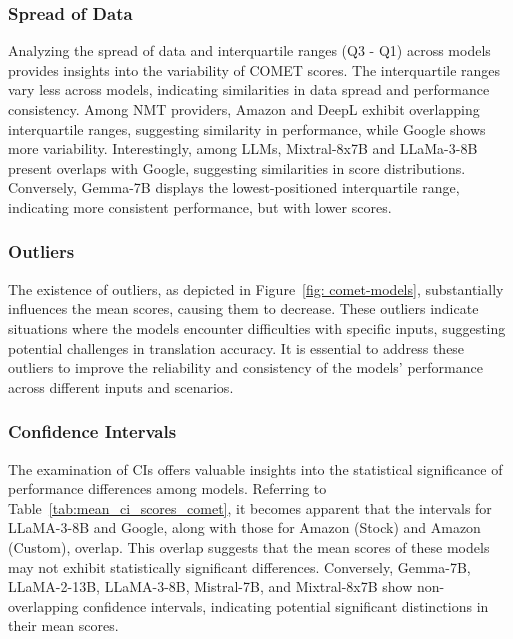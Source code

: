 \subsubsection{Spread of Data}

Analyzing the spread of data and interquartile ranges (Q3 - Q1) across models provides insights into the variability of COMET scores. The interquartile ranges vary less across models, indicating similarities in data spread and performance consistency. Among NMT providers, Amazon and DeepL exhibit overlapping interquartile ranges, suggesting similarity in performance, while Google shows more variability. Interestingly, among LLMs, Mixtral-8x7B and LLaMa-3-8B present overlaps with Google, suggesting similarities in score distributions. Conversely, Gemma-7B displays the lowest-positioned interquartile range, indicating more consistent performance, but with lower scores.


\subsubsection{Outliers}

The existence of outliers, as depicted in Figure~\ref{fig: comet-models}, substantially influences the mean scores, causing them to decrease. These outliers indicate situations where the models encounter difficulties with specific inputs, suggesting potential challenges in translation accuracy. It is essential to address these outliers to improve the reliability and consistency of the models' performance across different inputs and scenarios.


\subsubsection{Confidence Intervals}

The examination of CIs offers valuable insights into the statistical significance of performance differences among models. Referring to Table~\ref{tab:mean_ci_scores_comet}, it becomes apparent that the intervals for LLaMA-3-8B and Google, along with those for Amazon (Stock) and Amazon (Custom), overlap. This overlap suggests that the mean scores of these models may not exhibit statistically significant differences. Conversely, Gemma-7B, LLaMA-2-13B, LLaMA-3-8B, Mistral-7B, and Mixtral-8x7B show non-overlapping confidence intervals, indicating potential significant distinctions in their mean scores. 

